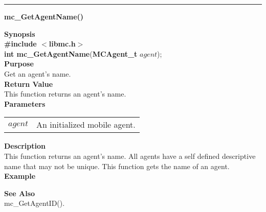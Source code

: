 \noindent
\vspace{5pt}
\rule{6.5in}{0.015in}
\noindent
{}
{\LARGE \bf mc\_GetAgentName()}\\
\label{api:mc_GetAgentName()}

\noindent
{\bf Synopsis}\\
{\bf \#include $<$libmc.h$>$}\\
{\bf int mc\_GetAgentName}({\bf MCAgent\_t} $agent$);\\

\noindent
{\bf Purpose}\\
Get an agent's name. \\

\noindent
{\bf Return Value}\\
This function returns an agent's name. \\

\noindent
{\bf Parameters}
\vspace{-0.1in}
\begin{description}
\item
\begin{tabular}{p{10 mm}p{145 mm}} 
$agent$ & An initialized mobile agent.
\end{tabular}
\end{description}

\noindent
{\bf Description}\\
This function returns an agent's name. All agents have a self defined
descriptive name that may not be unique. This function gets the name of
an agent.\\

\noindent
{\bf Example}\\
\noindent

\noindent
{\bf See Also}\\
mc\_GetAgentID().

